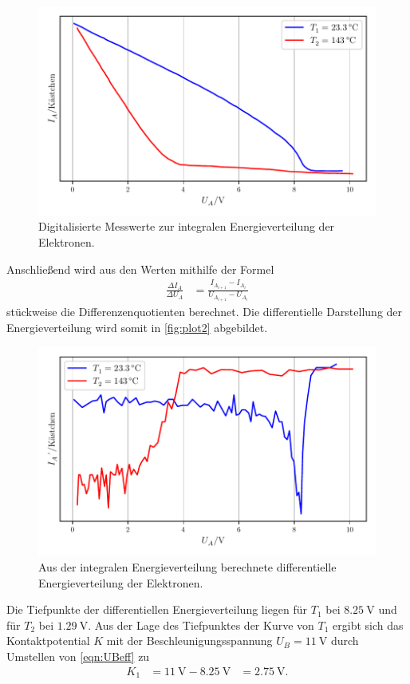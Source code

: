 \begin{figure}[H]
  \centering
  \includegraphics[width=\textwidth]{build/plot1.pdf}
  \caption {Digitalisierte Messwerte zur integralen Energieverteilung der Elektronen.}
  \label{fig:plot1}
\end{figure}

Anschließend wird aus den Werten mithilfe der Formel
\begin{align*}
  \frac{\Delta I_A}{\Delta U_A} &= \frac{I_{A_{i+1}}-I_{A_i}}{U_{A_{i+1}}-U_{A_i}}\label{eqn:diffquo}
\end{align*}
stückweise die Differenzenquotienten berechnet.
Die differentielle Darstellung der Energieverteilung wird somit in \autoref{fig:plot2} abgebildet.

\begin{figure}[H]
  \centering
  \includegraphics[width=\textwidth]{build/plot2.pdf}
  \caption {Aus der integralen Energieverteilung berechnete differentielle Energieverteilung der Elektronen.}
  \label{fig:plot2}
\end{figure}
Die Tiefpunkte der differentiellen Energieverteilung liegen für $T_1$ bei $\qty{8.25}{\volt}$ und für $T_2$ bei $\qty{1.29}{\volt}$.
Aus der Lage des Tiefpunktes der Kurve von $T_1$ ergibt sich das Kontaktpotential $K$ mit der Beschleunigungsspannung $U_B= \qty{11}{\volt}$
durch Umstellen von \autoref{eqn:UBeff} zu
\begin{align*}
  K_1 &= \qty{11}{\volt}-\qty{8.25}{\volt} &= \qty{2.75}{\volt}.\\
\end{align*}


